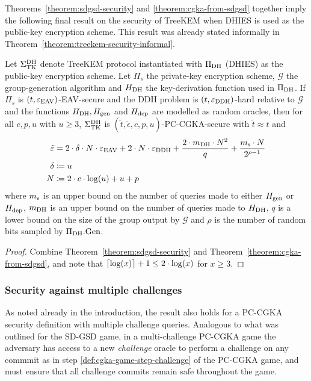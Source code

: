 Theorems~\ref{theorem:sdgsd-security} and \ref{theorem:cgka-from-sdgsd} together imply the following final result on the security of TreeKEM when DHIES is used as the public-key encryption scheme. This result was already stated informally in Theorem~\ref{theorem:treekem-security-informal}.

\begin{theorem} \label{theorem:treekem-security}
	Let $\Sigma_{\mathrm{TK}}^{\mathrm{DH}}$ denote TreeKEM protocol instantiated with $\Pi_{\mathrm{DH}}$ (DHIES) as the public-key encryption scheme. Let $\Pi_s$ the private-key encryption scheme, $\mathcal{G}$ the group-generation algorithm and $H_\mathrm{DH}$ the key-derivation function used in $\Pi_{\mathrm{DH}}$.
	If $\Pi_s$ is $(t, \varepsilon_\mathrm{EAV})$-EAV-secure and the DDH problem is $(t, \varepsilon_\mathrm{DDH})$-hard relative to $\mathcal{G}$ and the functions $H_\mathrm{DH}, H_\mathrm{gen}$ and $H_\mathrm{dep}$ are modelled as random oracles, then for all $c, p, u$ with $u \ge 3$, $\Sigma_{\mathrm{TK}}^{\mathrm{DH}}$ is $(\tilde{t}, \tilde{\epsilon}, c, p, u)$-PC-CGKA-secure with $\tilde{t} \approx t$ and
	\begin{align*}
		\tilde{\varepsilon} & = 2 \cdot \delta \cdot N \cdot \varepsilon_\mathrm{EAV} + 2 \cdot N \cdot \varepsilon_\mathrm{DDH} + \frac{2 \cdot m_\mathrm{DH} \cdot N^2}{q} + \frac{m_\mathrm{s} \cdot N}{2^{\rho - 1}} \\
		\delta           & \coloneqq u                                                                                                                        \\
		N                & \coloneqq 2 \cdot c \cdot \log(u) + u + p
	\end{align*}
	where $m_\mathrm{s}$ is an upper bound on the number of queries made to either $H_\mathrm{gen}$ or $H_\mathrm{dep}$, $m_\mathrm{DH}$ is an upper bound on the number of queries made to $H_\mathrm{DH}$, $q$ is a lower bound on the size of the group output by $\mathcal{G}$ and $\rho$ is the number of random bits sampled by $\Pi_{\mathrm{DH}}.\mathrm{Gen}$.
\end{theorem}

\begin{proof}
	Combine Theorem~\ref{theorem:sdgsd-security} and Theorem~\ref{theorem:cgka-from-sdgsd}, and note that $\lceil\log(x)\rceil + 1 \le 2 \cdot \log(x)$ for $x \ge 3$.
\end{proof}

\subsubsection{Security against multiple challenges} \label{sec:cgka-multiple-challenges}
As noted already in the introduction, the result also holds for a PC-CGKA security definition with multiple challenge queries. Analogous to what was outlined for the SD-GSD game, in a multi-challenge PC-CGKA game the adversary has access to a new \emph{challenge} oracle to perform a challenge on any commmit as in step \ref{def:cgka-game-step-challenge} of the PC-CGKA game, and must ensure that all challenge commits remain safe throughout the game.


